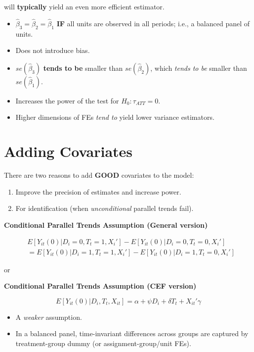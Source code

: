 \documentclass[
  letterpaper,
  DIV=11,
  numbers=noendperiod]{scrreprt}
\providecommand{\tightlist}{%
  \setlength{\itemsep}{0pt}\setlength{\parskip}{0pt}}\usepackage{longtable,booktabs,array}
\theoremstyle{definition}
\theoremstyle{remark}
\begin{document}
will \textbf{typically} yield an even more efficient estimator.

\begin{itemize}
\tightlist
\item
  \(\hat{\beta}_3=\hat{\beta}_2=\hat{\beta}_1\) \textbf{IF} all units
  are observed in all periods; i.e., a balanced panel of units.
\item
  Does not introduce bias.
\item
  \(se(\hat{\beta}_3)\) \textbf{tends to be} smaller than
  \(se(\hat{\beta}_2)\), which \emph{tends to be} smaller than
  \(se(\hat{\beta}_1)\).
\item
  Increases the power of the test for \(H_0: \tau_{ATT}=0\).
\item
  Higher dimensions of FEs \emph{tend to} yield lower variance
  estimators.
\end{itemize}

\hypertarget{adding-covariates-2}{%
\section{Adding Covariates}\label{adding-covariates-2}}

There are two reasons to add \textbf{GOOD} covariates to the model:

\begin{enumerate}
\def\labelenumi{\arabic{enumi}.}
\tightlist
\item
  Improve the precision of estimates and increase power.
\item
  For identification (when \emph{unconditional} parallel trends fail).
\end{enumerate}

\textbf{Conditional Parallel Trends Assumption (General version)}

\[
\begin{aligned}
&E[Y_{it}(0)|D_i=0,T_t=1,X_i'] - E[Y_{it}(0)|D_i=0,T_t=0,X_i'] \\
&= E[Y_{it}(0)|D_i=1,T_t=1,X_i'] - E[Y_{it}(0)|D_i=1,T_t=0,X_i']
\end{aligned}
\]

or

\textbf{Conditional Parallel Trends Assumption (CEF version)}

\[
E[Y_{it}(0)|D_i,T_t,X_{it}] = \alpha + \psi D_i + \delta T_t + X_{it}'\gamma
\]

\begin{itemize}
\tightlist
\item
  A \emph{weaker} assumption.
\item
  In a balanced panel, time-invariant differences across groups are
  captured by treatment-group dummy (or assignment-group/unit FEs).
\end{itemize}
\end{document}
